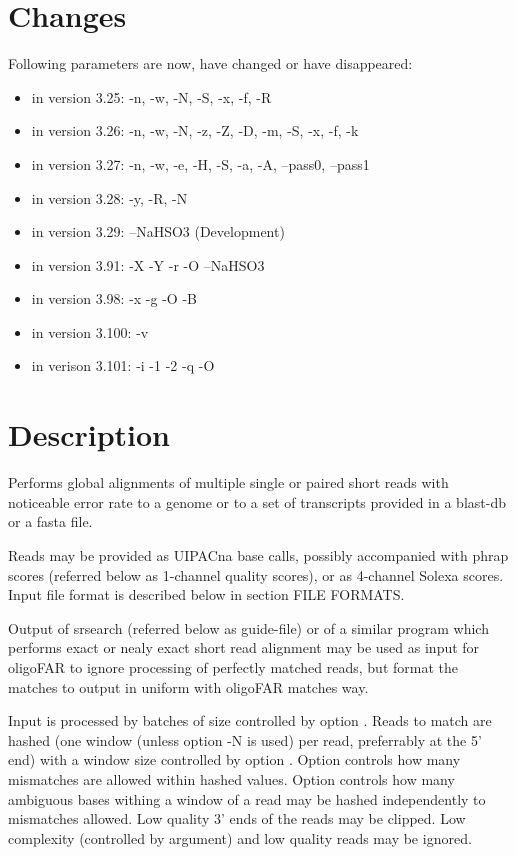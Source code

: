 \documentclass[english,letter]{article}
\begin{document}
\section{Changes}
	Following parameters are now, have changed or have disappeared:\\
	\begin{itemize}
    \item in version 3.25: -n, -w, -N, -S, -x, -f, -R 
    \item in version 3.26: -n, -w, -N, -z, -Z, -D, -m, -S, -x, -f, -k
    \item in version 3.27: -n, -w, -e, -H, -S, -a, -A, --pass0, --pass1
    \item in version 3.28: -y, -R, -N
    \item in version 3.29: --NaHSO3 (Development)
    \item in version 3.91: -X -Y -r -O --NaHSO3 
    \item in version 3.98: -x -g -O -B
    \item in version 3.100: -v 
    \item in verison 3.101: -i -1 -2 -q -O
	\end{itemize}

\section{Description}
    Performs global alignments of multiple single or paired short reads 
    with noticeable error rate to a genome or to a set of transcripts 
    provided in a blast-db or a fasta file.

    Reads may be provided as UIPACna base calls, possibly accompanied 
    with phrap scores (referred below as 1-channel quality scores), 
    or as 4-channel Solexa scores. Input file format is described 
    below in section FILE FORMATS.

    Output of srsearch (referred below as guide-file) or of a similar 
    program which performs exact or nealy exact short read alignment
    may be used as input for oligoFAR to ignore processing of perfectly 
    matched reads, but format the matches to output in uniform with
    oligoFAR matches way.

    Input is processed by batches of size controlled by option . 
    Reads to match are hashed (one window (unless option -N is used) per read, 
    preferrably at the 5' end) with a window size controlled by option . 
    Option  controls how many mismatches are allowed within hashed values.  
    Option  controls how many ambiguous bases withing a window of a read 
    may be hashed independently to mismatches allowed. Low quality 3' ends 
    of the reads may be clipped.  Low complexity (controlled by  argument) 
    and low quality reads may be ignored.
\end{document}
